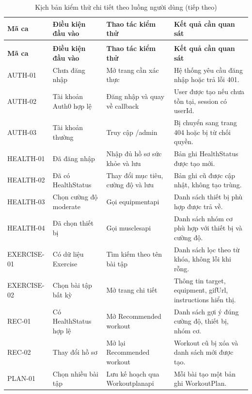 \begingroup
\small
\setlength{\tabcolsep}{3pt}
\renewcommand{\arraystretch}{1.25}
\begin{longtable}{|P{0.160\textwidth}|P{0.280\textwidth}|P{0.280\textwidth}|P{0.200\textwidth}|}
\caption{Kịch bản kiểm thử chi tiết theo luồng người dùng}\\
\hline
\textbf{Mã ca} & \textbf{Điều kiện đầu vào} & \textbf{Thao tác kiểm thử} & \textbf{Kết quả cần quan sát} \\
\hline
\endfirsthead
\caption[]{Kịch bản kiểm thử chi tiết theo luồng người dùng (tiếp theo)}\\
\hline
\textbf{Mã ca} & \textbf{Điều kiện đầu vào} & \textbf{Thao tác kiểm thử} & \textbf{Kết quả cần quan sát} \\
\hline
\endhead
AUTH-01 & Chưa đăng nhập & Mở trang cần xác thực & Hệ thống yêu cầu đăng nhập hoặc trả lỗi 401. \\
\hline
AUTH-02 & Tài khoản Auth0 hợp lệ & Đăng nhập và quay về callback & User được tạo nếu chưa tồn tại, session có userId. \\
\hline
AUTH-03 & Tài khoản thường & Truy cập /admin & Bị chuyển sang trang 404 hoặc bị từ chối quyền. \\
\hline
HEALTH-01 & Đã đăng nhập & Nhập đủ hồ sơ sức khỏe và lưu & Bản ghi HealthStatus được tạo mới. \\
\hline
HEALTH-02 & Đã có HealthStatus & Thay đổi mục tiêu, cường độ và lưu & Bản ghi cũ được cập nhật, không tạo trùng. \\
\hline
HEALTH-03 & Chọn cường độ moderate & Gọi equipmentapi & Danh sách thiết bị phù hợp được trả về. \\
\hline
HEALTH-04 & Đã chọn thiết bị & Gọi musclesapi & Danh sách nhóm cơ phù hợp với thiết bị và cường độ. \\
\hline
EXERCISE-01 & Có dữ liệu Exercise & Tìm kiếm theo tên bài tập & Danh sách lọc theo từ khóa, không lỗi khi rỗng. \\
\hline
EXERCISE-02 & Chọn bài tập bất kỳ & Mở trang chi tiết & Thông tin target, equipment, gifUrl, instructions hiển thị. \\
\hline
REC-01 & Có HealthStatus hợp lệ & Mở Recommended workout & Danh sách gợi ý đúng cường độ, thiết bị, nhóm cơ. \\
\hline
REC-02 & Thay đổi hồ sơ & Mở lại Recommended workout & Workout cũ bị xóa và danh sách mới được tạo. \\
\hline
PLAN-01 & Chọn nhiều bài tập & Lưu kế hoạch qua Workoutplanapi & Mỗi bài tạo một bản ghi WorkoutPlan. \\

\end{longtable}
